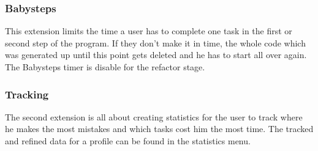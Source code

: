 \documentclass[10pt,a4paper]{article}
\begin{document}
\subsubsection{Babysteps}
This extension limits the time a user has to complete one task in the first or second step of the program. If they don't make it in time, the whole code which was generated up until this point gets deleted and he has to start all over again.
The Babysteps timer is disable for the refactor stage.
\subsubsection{Tracking}
The second extension is all about creating statistics for the user to track where he makes the most mistakes and which tasks cost him the most time. The tracked and refined data for a profile can be found in the statistics menu.
\end{document}

